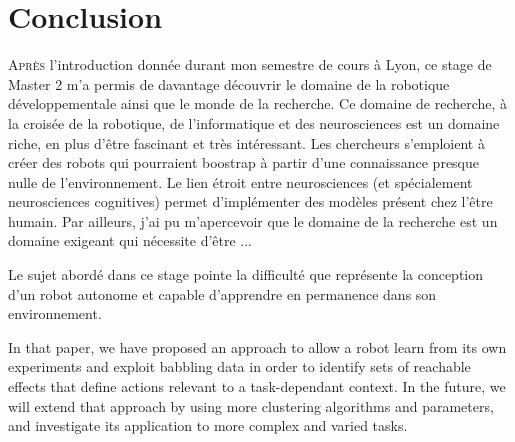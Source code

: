 \documentclass[draft]{llncs}
\begin{document}
\section{Conclusion}

\lettrine{A}{près} l'introduction donnée durant mon semestre de cours à Lyon, ce stage de Master 2 m'a permis de davantage découvrir le domaine de la robotique développementale ainsi que le monde de la recherche.
Ce domaine de recherche, à la croisée de la robotique, de l'informatique et des neurosciences est un domaine riche, en plus d'être fascinant et très intéressant.
Les chercheurs s'emploient à créer des robots qui pourraient boostrap à partir d'une connaissance presque nulle de l'environnement.
Le lien étroit entre neurosciences (et spécialement neurosciences cognitives) permet d'implémenter des modèles présent chez l'être humain.
Par ailleurs, j'ai pu m'apercevoir que le domaine de la recherche est un domaine exigeant qui nécessite d'être ...

Le sujet abordé dans ce stage pointe la difficulté que représente la conception d'un robot autonome et capable d'apprendre en permanence dans son environnement.

In that paper, we have proposed an approach to allow a robot learn from its own experiments and exploit babbling data in order to identify sets of reachable effects that define actions relevant to a task-dependant context.
In the future, we will extend that approach by using more clustering algorithms and parameters, and investigate its application to more complex and varied tasks.


\end{document}
